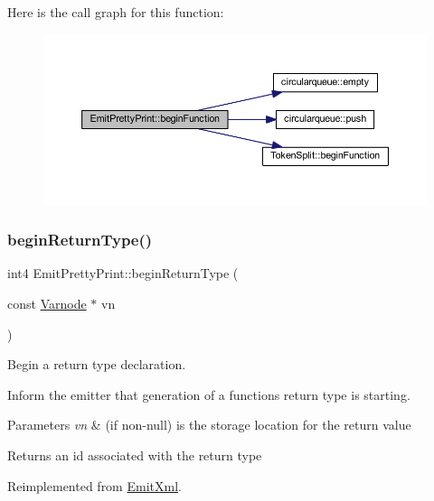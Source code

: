 Here is the call graph for this function\+:
\nopagebreak
\begin{figure}[H]
\begin{center}
\leavevmode
\includegraphics[width=350pt]{class_emit_pretty_print_afc7d7ad8e92e3aebb5098ab3aa90153d_cgraph}
\end{center}
\end{figure}
\mbox{\label{class_emit_pretty_print_a0318a1f41c45d521b22ca097a4a29793}} 
\subsubsection{\texorpdfstring{beginReturnType()}{beginReturnType()}}
{\footnotesize\ttfamily int4 Emit\+Pretty\+Print\+::begin\+Return\+Type (\begin{DoxyParamCaption}\item[{const \mbox{\hyperlink{class_varnode}{Varnode}} $\ast$}]{vn }\end{DoxyParamCaption})\hspace{0.3cm}{\ttfamily [virtual]}}



Begin a return type declaration. 

Inform the emitter that generation of a function\textquotesingle{}s return type is starting. 
\begin{DoxyParams}{Parameters}
{\em vn} & (if non-\/null) is the storage location for the return value \\
\hline
\end{DoxyParams}
\begin{DoxyReturn}{Returns}
an id associated with the return type 
\end{DoxyReturn}


Reimplemented from \mbox{\hyperlink{class_emit_xml_ac0216ea06080892db047c720a38ba304}{Emit\+Xml}}.




